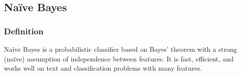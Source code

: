 \subsection{Naïve Bayes}
\subsubsection{Definition}

Naïve Bayes is a probabilistic classifier based on Bayes' theorem with a strong (naïve) assumption of independence between features. It is fast, efficient, and works well on text and classification problems with many features.
